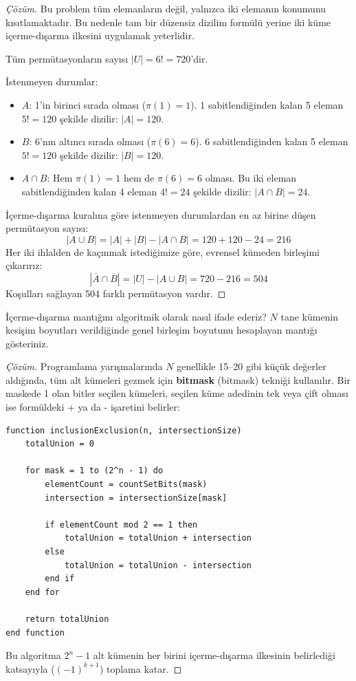 \begin{proof}[Çözüm]
Bu problem tüm elemanların değil, yalnızca iki elemanın konumunu kısıtlamaktadır.
Bu nedenle tam bir düzensiz dizilim formülü yerine iki küme içerme-dışarma
ilkesini uygulamak yeterlidir.

Tüm permütasyonların sayısı $|U| = 6! = 720$'dir.

İstenmeyen durumlar: \begin{itemize} \item $A$: 1'in birinci sırada olması
($\pi(1) = 1$). 1 sabitlendiğinden kalan 5 eleman $5! = 120$ şekilde dizilir:
$|A| = 120$. \item $B$: 6'nın altıncı sırada olması ($\pi(6) = 6$). 6 sabitlendiğinden
kalan 5 eleman $5! = 120$ şekilde dizilir: $|B| = 120$. \item $A \cap B$: Hem
$\pi(1) = 1$ hem de $\pi(6) = 6$ olması. Bu iki eleman sabitlendiğinden kalan 4
eleman $4! = 24$ şekilde dizilir: $|A \cap B| = 24$. \end{itemize} İçerme-dışarma
kuralına göre istenmeyen durumlardan en az birine düşen permütasyon sayısı: \[
|A \cup B| = |A| + |B| - |A \cap B| = 120 + 120 - 24 = 216 \] Her iki ihlalden de
kaçınmak istediğimize göre, evrensel kümeden birleşimi çıkarırız: \[ |\overline{A}
\cap \overline{B}| = |U| - |A \cup B| = 720 - 216 = 504 \] Koşulları sağlayan 504
farklı permütasyon vardır. \end{proof}

\begin{example} İçerme-dışarma mantığını algoritmik olarak nasıl ifade ederiz? $N$
tane kümenin kesişim boyutları verildiğinde genel birleşim boyutunu hesaplayan
mantığı gösteriniz. \end{example}

\begin{proof}[Çözüm] Programlama yarışmalarında $N$ genellikle 15--20 gibi küçük
değerler aldığında, tüm alt kümeleri gezmek için \textbf{bitmask} (bitmask)
tekniği kullanılır. Bir maskede 1 olan bitler seçilen kümeleri, seçilen küme
adedinin tek veya çift olması ise formüldeki + ya da - işaretini belirler:

\begin{lstlisting}
function inclusionExclusion(n, intersectionSize)
    totalUnion = 0
    
    for mask = 1 to (2^n - 1) do
        elementCount = countSetBits(mask)
        intersection = intersectionSize[mask]
        
        if elementCount mod 2 == 1 then
            totalUnion = totalUnion + intersection
        else
            totalUnion = totalUnion - intersection
        end if
    end for
    
    return totalUnion
end function\end{lstlisting}
Bu algoritma $2^n - 1$ alt kümenin her birini içerme-dışarma ilkesinin
belirlediği katsayıyla ($(-1)^{k+1}$) toplama katar.
\end{proof}
